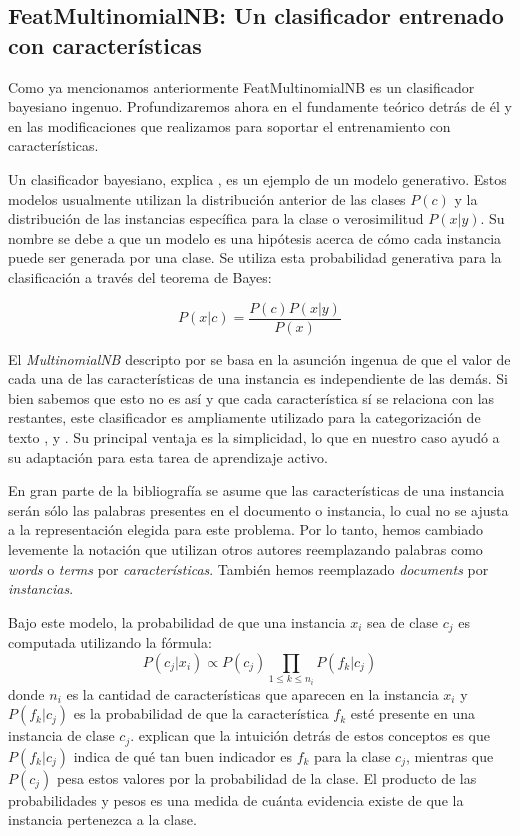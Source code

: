 \subsection{FeatMultinomialNB: Un clasificador entrenado con características}

Como ya mencionamos anteriormente FeatMultinomialNB es un clasificador bayesiano ingenuo. Profundizaremos ahora en el fundamente teórico detrás de él y en las modificaciones que realizamos para soportar el entrenamiento con características.

Un clasificador bayesiano, explica \citet{libro-abney}, es un ejemplo de un modelo generativo. Estos modelos usualmente utilizan la distribución anterior de las clases $P(c)$ y la distribución de las instancias específica para la clase o verosimilitud $P(x|y)$. Su nombre se debe a que un modelo es una hipótesis acerca de cómo cada instancia puede ser generada por una clase. Se utiliza esta probabilidad generativa para la clasificación a través del teorema de Bayes:

$$P(x|c) = \frac{P(c)P(x|y)}{P(x)}$$

El \textit{MultinomialNB} descripto por \citet{multinomial-manning} se basa en la asunción ingenua de que el valor de cada una de las características de una instancia es independiente de las demás. Si bien sabemos que esto no es así y que cada característica sí se relaciona con las restantes, este clasificador es ampliamente utilizado para la categorización de texto \citet{dualist}, \citet{multinomialnb-comparision-mccallum} y \citet{multinomialnb-unbalanced}. Su principal ventaja es la simplicidad, lo que en nuestro caso ayudó a su adaptación para esta tarea de aprendizaje activo.

En gran parte de la bibliografía se asume que las características de una instancia serán sólo las palabras presentes en el documento o instancia, lo cual no se ajusta a la representación elegida para este problema. Por lo tanto, hemos cambiado levemente la notación que utilizan otros autores reemplazando palabras como \textit{words} o \textit{terms} por \textit{características}. También hemos reemplazado \textit{documents} por \textit{instancias}.

Bajo este modelo, la probabilidad de que una instancia $x_i$ sea de clase $c_j$ es computada utilizando la fórmula:
\begin{equation}\label{eq-mnb-prob}
    P(c_j|x_i) \propto P(c_j) \prod_{1\leq k \leq n_i}P(f_k|c_j)
\end{equation}
donde $n_i$ es la cantidad de características que aparecen en la instancia $x_i$ y $P(f_k|c_j)$ es la probabilidad de que la característica $f_k$ esté presente en una instancia de clase $c_j$. \citet{multinomial-manning} explican que la intuición detrás de estos conceptos es que $P(f_k|c_j)$ indica de qué tan buen indicador es $f_k$ para la clase $c_j$, mientras que $P(c_j)$ pesa estos valores por la probabilidad de la clase. El producto de las probabilidades y pesos es una medida de cuánta evidencia existe de que la instancia pertenezca a la clase.

